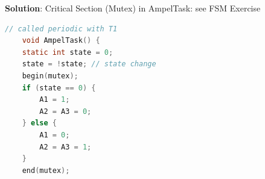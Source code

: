 
\newpage

\textbf{Solution}: Critical Section (Mutex) in AmpelTask:  see FSM Exercise\\

\begin{lstlisting}[style=mystyle, language=c]
 	// called periodic with T1  
	void AmpelTask() {
	static int state = 0;
	state = !state; // state change
  	begin(mutex);
	if (state == 0) {
		A1 = 1;
		A2 = A3 = 0;
	} else {
		A1 = 0;
		A2 = A3 = 1;
	}
  	end(mutex);
\end{lstlisting}

